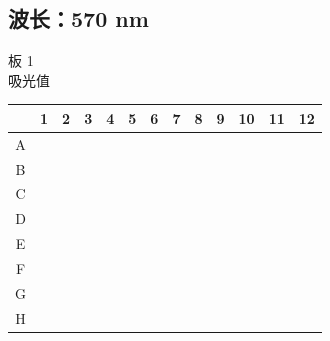 \documentclass[UTF8,10pt,a4paper,fontset=fandol]{ctexart}
\begin{document}
\subsection*{波长：570 nm}

\noindent
板 1\\
吸光值

\begin{center}
\scriptsize
\begin{tabular}{c|*{12}{p{0.52cm}|}}
 & 1 & 2 & 3 & 4 & 5 & 6 & 7 & 8 & 9 & 10 & 11 & 12\\ \hline
A & & & &
\parbox[t]{0.5cm}{} &
\parbox[t]{0.5cm}{} &
\parbox[t]{0.5cm}{} &
\parbox[t]{0.5cm}{} &
\parbox[t]{0.5cm}{} &
\parbox[t]{0.5cm}{} &
& & \\ \hline
B & & & &
\parbox[t]{0.5cm}{} &
\parbox[t]{0.5cm}{} &
\parbox[t]{0.5cm}{} &
\parbox[t]{0.5cm}{} &
\parbox[t]{0.5cm}{} &
\parbox[t]{0.5cm}{} &
& & \\ \hline
C & & & &
\parbox[t]{0.5cm}{} &
\parbox[t]{0.5cm}{} &
\parbox[t]{0.5cm}{} &
\parbox[t]{0.5cm}{} &
\parbox[t]{0.5cm}{} &
\parbox[t]{0.5cm}{} &
& & \\ \hline
D & & & &
\parbox[t]{0.5cm}{} &
\parbox[t]{0.5cm}{} &
\parbox[t]{0.5cm}{} &
\parbox[t]{0.5cm}{} &
\parbox[t]{0.5cm}{} &
\parbox[t]{0.5cm}{} &
& & \\ \hline
E & & & &
\parbox[t]{0.5cm}{} &
\parbox[t]{0.5cm}{} &
\parbox[t]{0.5cm}{} &
\parbox[t]{0.5cm}{} &
\parbox[t]{0.5cm}{} &
\parbox[t]{0.5cm}{} &
& & \\ \hline
F & & & &
\parbox[t]{0.5cm}{} &
\parbox[t]{0.5cm}{} &
\parbox[t]{0.5cm}{} &
\parbox[t]{0.5cm}{} &
\parbox[t]{0.5cm}{} &
\parbox[t]{0.5cm}{} &
& & \\ \hline
G & & & &
\parbox[t]{0.5cm}{} &
\parbox[t]{0.5cm}{} &
\parbox[t]{0.5cm}{} &
\parbox[t]{0.5cm}{} &
\parbox[t]{0.5cm}{} &
\parbox[t]{0.5cm}{} &
& & \\ \hline
H & & & &
\parbox[t]{0.5cm}{} &
\parbox[t]{0.5cm}{} &
\parbox[t]{0.5cm}{} &
\parbox[t]{0.5cm}{} &
\parbox[t]{0.5cm}{} &
\parbox[t]{0.5cm}{} &
& & \\ \hline
\end{tabular}
\end{center}
\end{document}
